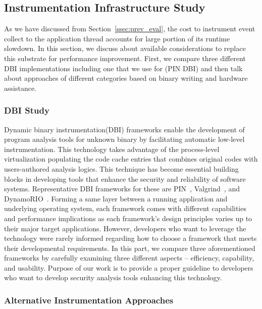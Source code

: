 \subsection{Instrumentation Infrastructure Study}
\label{ssec:inst_infra}

As we have discussed from Section~\ref{ssec:prev_eval}, the cost to instrument
event collect to the application thread accounts for large portion of its
runtime slowdown. In this section, we discuss about available considerations to
replace this substrate for performance improvement. First, we compare three
different DBI implementations including one that we use for \sreplica (PIN DBI)
and then talk about approaches of different categories based on binary writing
and hardware assistance.

\subsubsection{DBI Study} 
\label{ssec:dbi_study}

Dynamic binary instrumentation(DBI) frameworks enable the development of
program analysis tools for unknown binary by facilitating automatic low-level
instrumentation. This technology takes advantage of the process-level
virtualization populating the code cache entries that combines original codes
with users-authored analysis logics. This technique has become essential
building blocks in developing tools that enhance the security and reliability
of software systems.  Representative DBI frameworks for these are PIN~\cite{},
Valgrind~\cite{}, and DynamoRIO~\cite{}.
%
Forming a same layer between a running application and underlying operating
system, each framework comes with different capabilities and performance
implications as each framework’s design principles varies up to their major
target applications. However, developers who want to leverage the technology
were rarely informed regarding how to choose a framework that meets their
developmental requirements.
%
In this part, we compare three aforementioned frameworks by carefully examining
three different aspects – efficiency, capability, and usability. Purpose of our
work is to provide a proper guideline to developers who want to develop
security analysis tools enhancing this technology.

\subsubsection{Alternative Instrumentation Approaches}


